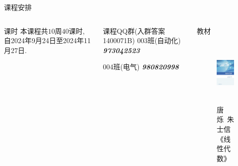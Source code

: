 \begin{frame}[<*>]{课程安排}
	\begin{columns}
			\begin{block*}{课时}
				本课程共$10$周$40$课时, 自2024年9月24日至2024年11月27日.
			\end{block*}
			\vspace{.4\baselineskip}
			\onslide<+->
			\begin{block}{课程QQ群(入群答案 1400071B)}
				\vspace{\baselineskip}
					003班(自动化) \emph{\textbf{973042523}}
					\vspace{\baselineskip}
					
					004班(电气) \emph{\textbf{980820998}}
			\end{block}
			\begin{block}{教材}
				\begin{figure}
					\includegraphics[height=32mm]{../image/book.jpg}
					\caption{唐烁\ 朱士信《线性代数》}
				\end{figure}
			\end{block}
		\end{columns}
\end{frame}





